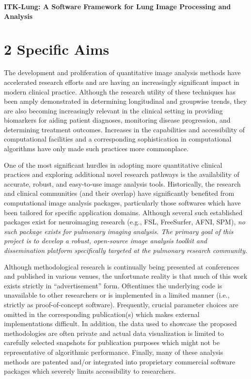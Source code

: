 \documentclass[11pt,]{article}
\title{}
\author{}
\date{}
\begin{document}
\maketitle



\begin{center}
{\Large \bf ITK-Lung:  A Software Framework for Lung Image Processing and Analysis}
\end{center}

\section{2 Specific Aims}\label{specific-aims}

The development and proliferation of quantitative image analysis methods
have accelerated research efforts and are having an increasingly
significant impact in modern clinical practice. Although the research
utility of these techniques has been amply demonstrated in determining
longitudinal and groupwise trends, they are also becoming increasingly
relevant in the clinical setting in providing biomarkers for aiding
patient diagnoses, monitoring disease progression, and determining
treatment outcomes. Increases in the capabilities and accessibility of
computational facilities and a corresponding sophistication in
computational algorithms have only made such practices more commonplace.

One of the most significant hurdles in adopting more quantitative
clinical practices and exploring additional novel research pathways is
the availability of accurate, robust, and easy-to-use image analysis
tools. Historically, the research and clinical communities (and their
overlap) have significantly benefited from computational image analysis
packages, particularly those softwares which have been tailored for
specific application domains. Although several such established packages
exist for neuroimaging research (e.g., FSL, FreeSurfer, AFNI, SPM),
\emph{no such package exists for pulmonary imaging analysis. The primary
goal of this project is to develop a robust, open-source image analysis
toolkit and dissemination platform specifically targeted at the
pulmonary research community.}

Although methodological research is continually being presented at
conferences and published in various venues, the unfortunate reality is
that much of this work exists strictly in ``advertisement'' form.
Oftentimes the underlying code is unavailable to other researchers or is
implemented in a limited manner (i.e., strictly as proof-of-concept
software). Frequently, crucial parameter choices are omitted in the
corresponding publication(s) which makes external implementations
difficult. In addition, the data used to showcase the proposed
methodologies are often private and actual data visualization is limited
to carefully selected snapshots for publication purposes which might not
be representative of algorithmic performance. Finally, many of these
analysis methods are patented and/or integrated into proprietary
commercial software packages which severely limits accessibility to
researchers.
\end{document}
